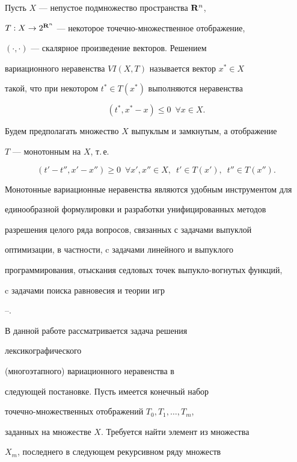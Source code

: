 Пусть $X$ --- непустое подмножество пространства $\bold R^n$,


$T: X\to 2^{\bold R^n}$ --- некоторое точечно-множественное отображение,


$(\cdot,\cdot)$ --- скалярное произведение векторов. Решением


вариационного неравенства $VI (X,T)$ называется вектор $x^*\in X$


такой, что при некотором $t^*\in T(x^*)$ выполняются неравенства


$$


(t^*, x^*-x)\le 0\ \; \forall x\in X.


$$





Будем предполагать множество $X$ выпуклым и замкнутым, а отображение


$T$ --- монотонным на $X$, т.\,е.


$$


(t'-t'', x'-x'')\ge 0\ \; \forall x', x''\in X,\ \; t'\in T(x'),


\ \; t''\in T(x'').


$$





Монотонные вариационные неравенства являются удобным инструментом для


единообразной формулировки и разработки унифицированных методов


разрешения целого ряда вопросов, связанных с задачами выпуклой


оптимизации, в частности, c задачами линейного и выпуклого


программирования, отыскания седловых точек выпукло-вогнутых функций,


c задачами поиска равновесия и теории игр


\cite{1}--\cite{3}.





В данной работе рассматривается задача решения {\it


лексикографического} (многоэтапного) вариационного неравенства в


следующей постановке. Пусть имеется конечный набор


точечно-множественных отображений $T_0,T_1,\dotsc,T_m$,


заданных на множестве $X$. Требуется найти элемент из множества


$X_m$, последнего в следующем рекурсивном ряду множеств


